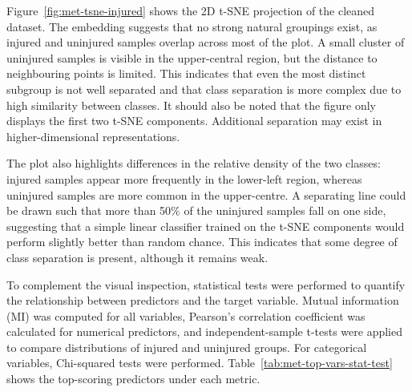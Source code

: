 Figure~\ref{fig:met-tsne-injured} shows the 2D t-SNE projection of the cleaned dataset. The embedding suggests that no strong natural groupings exist, as injured and uninjured samples overlap across most of the plot. A small cluster of uninjured samples is visible in the upper-central region, but the distance to neighbouring points is limited. This indicates that even the most distinct subgroup is not well separated and that class separation is more complex due to high similarity between classes. It should also be noted that the figure only displays the first two t-SNE components. Additional separation may exist in higher-dimensional representations.  

The plot also highlights differences in the relative density of the two classes: injured samples appear more frequently in the lower-left region, whereas uninjured samples are more common in the upper-centre. A separating line could be drawn such that more than 50\% of the uninjured samples fall on one side, suggesting that a simple linear classifier trained on the t-SNE components would perform slightly better than random chance. This indicates that some degree of class separation is present, although it remains weak.  

To complement the visual inspection, statistical tests were performed to quantify the relationship between predictors and the target variable. Mutual information (MI) was computed for all variables, Pearson's correlation coefficient was calculated for numerical predictors, and independent-sample t-tests were applied to compare distributions of injured and uninjured groups. For categorical variables, Chi-squared tests were performed. Table~\ref{tab:met-top-vars-stat-test} shows the top-scoring predictors under each metric.  
 
